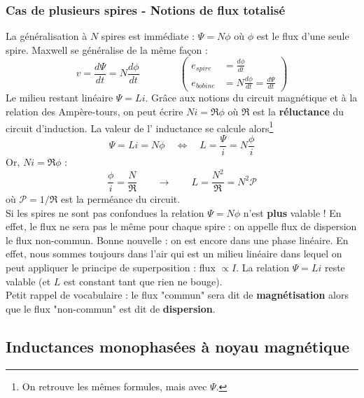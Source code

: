 		\subsubsection{Cas de plusieurs spires - Notions de flux 
		totalisé}
		La généralisation à $N$ spires est immédiate : $\Psi = 
		N\phi$ où $\phi$ est le flux d'une seule spire. Maxwell 
		se généralise de la même façon :
		\begin{equation}
		v = \frac{d\Psi}{dt} = N\frac{d\phi}{dt}\qquad\qquad\left(
		\begin{array}{ll}
		e_{spire} &= \frac{d\phi}{dt}\\
		e_{bobine} &= N\frac{d\phi}{dt} = \frac{d\Psi}{dt}
		\end{array}\right)
		\end{equation}
		Le milieu restant linéaire $\Psi = Li$. Grâce aux notions 
		du circuit magnétique et à la relation des Ampère-tours, on 
		peut écrire $Ni = \mathfrak{R}\phi$ où $\mathfrak{R}$ est la 
		\textbf{réluctance} du circuit d'induction. La valeur de l'
		inductance se calcule alors\footnote{On retrouve les mêmes formules, 
		mais avec $\Psi$.}
		\begin{equation}
		\Psi = Li = N\phi\quad \Leftrightarrow\quad L = \dfrac{\Psi}{i} = 
		N\dfrac{\phi}{i}
		\end{equation}
		$\text{Or, } Ni=\mathfrak{R}\phi$ :
		\begin{equation}
		\dfrac{\phi}{i} = \dfrac{N}{\mathfrak{R}}\qquad\longrightarrow\qquad 
		L = \frac{N^2}{\mathfrak{R}} 
		= N^2 \mathcal{P}
		\end{equation}
		où $\mathcal{P} = 1/\mathfrak{R}$ est la perméance du circuit. \\
		\danger Si les spires ne sont pas confondues la 
		relation $\Psi = N\phi$ n'est \textbf{plus} valable ! En effet, 
		le flux ne sera pas le même pour chaque spire : on appelle 
		flux de dispersion le flux non-commun. Bonne nouvelle : on est 
		encore dans une phase linéaire. En effet, nous sommes toujours 
		dans l'air qui est un milieu linéaire dans lequel on peut appliquer 
		le principe de superposition : flux $\propto I$. La relation  
		$\Psi = Li$ reste valable (et $L$ est constant tant que rien ne bouge).\\
		
		Petit rappel de vocabulaire : le flux "commun" sera dit de \textbf{magnétisation} 
		alors que le flux "non-commun" est dit de \textbf{dispersion}.		
		
		
	\subsection{Inductances monophasées à noyau magnétique}		
